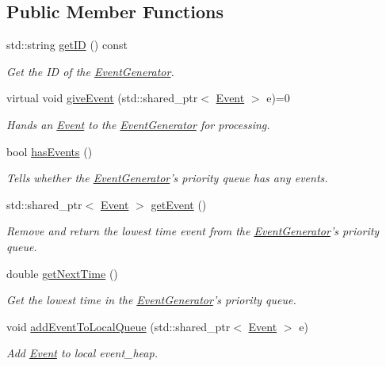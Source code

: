 \subsection*{\-Public \-Member \-Functions}
\begin{DoxyCompactItemize}
\item 
std\-::string \hyperlink{classEventGenerator_a467b319c4317b83b9c16708c9815953d}{get\-I\-D} () const 
\begin{DoxyCompactList}\small\item\em \-Get the \-I\-D of the \hyperlink{classEventGenerator}{\-Event\-Generator}. \end{DoxyCompactList}\item 
virtual void \hyperlink{classEventGenerator_a7448c87e533a9b38c20d914fa6a13c8e}{give\-Event} (std\-::shared\-\_\-ptr$<$ \hyperlink{classEvent}{\-Event} $>$ e)=0
\begin{DoxyCompactList}\small\item\em \-Hands an \hyperlink{classEvent}{\-Event} to the \hyperlink{classEventGenerator}{\-Event\-Generator} for processing. \end{DoxyCompactList}\item 
bool \hyperlink{classEventGenerator_a1fd7fdcaa263115e89a9fc69b85eca22}{has\-Events} ()
\begin{DoxyCompactList}\small\item\em \-Tells whether the \hyperlink{classEventGenerator}{\-Event\-Generator}'s priority queue has any events. \end{DoxyCompactList}\item 
std\-::shared\-\_\-ptr$<$ \hyperlink{classEvent}{\-Event} $>$ \hyperlink{classEventGenerator_ab40fd3a0bf1aa974ba50feb443d81009}{get\-Event} ()
\begin{DoxyCompactList}\small\item\em \-Remove and return the lowest time event from the \hyperlink{classEventGenerator}{\-Event\-Generator}'s priority queue. \end{DoxyCompactList}\item 
double \hyperlink{classEventGenerator_ac4b5ccdeaf232fe59854535bb13747a9}{get\-Next\-Time} ()
\begin{DoxyCompactList}\small\item\em \-Get the lowest time in the \hyperlink{classEventGenerator}{\-Event\-Generator}'s priority queue. \end{DoxyCompactList}\item 
void \hyperlink{classEventGenerator_a3487849484c9b521527d6acacee79e88}{add\-Event\-To\-Local\-Queue} (std\-::shared\-\_\-ptr$<$ \hyperlink{classEvent}{\-Event} $>$ e)
\begin{DoxyCompactList}\small\item\em \-Add \hyperlink{classEvent}{\-Event} to local event\-\_\-heap. \end{DoxyCompactList}\end{DoxyCompactItemize}
